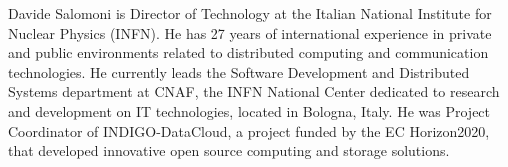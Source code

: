 \documentclass[journal]{IEEEtran}
\begin{document}
\begin{IEEEbiography}{Davide Salomoni}
is Director of Technology at the Italian National Institute for Nuclear Physics (INFN). He has 27 years of international experience in private and public environments related to distributed computing and communication technologies. He currently leads the Software Development and Distributed Systems department at CNAF, the INFN National Center dedicated to research and development on IT technologies, located in Bologna, Italy. He was Project Coordinator of INDIGO-DataCloud, a project funded by the EC Horizon2020, that developed innovative open source computing and storage solutions.
\end{IEEEbiography}
\end{document}

